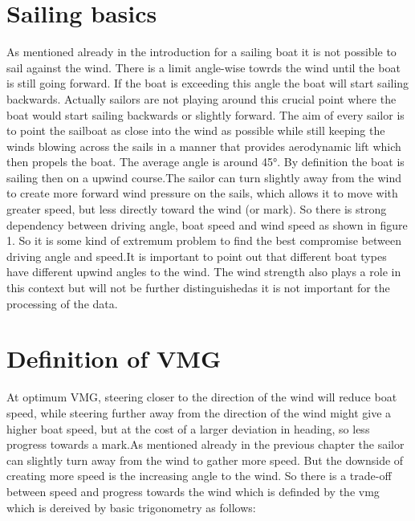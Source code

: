 \chapter{Sailing basics}
As mentioned already in the introduction for a sailing boat it is not possible to sail against the wind. There is a limit angle-wise towrds the wind until the boat is still going forward. If the boat is exceeding this angle the boat will start sailing backwards. Actually sailors are not playing around this crucial point where the boat would start sailing backwards or slightly forward. The aim of every sailor is to point the sailboat as close into the wind as possible while still keeping the winds blowing across the sails in a manner that provides aerodynamic lift which then propels the boat. The average angle is around 45°. By definition the boat is sailing then on a upwind course.The sailor can turn slightly away from the wind to create more forward wind pressure on the sails, which allows it to move with greater speed, but less directly toward the wind (or mark). So there is strong dependency between driving angle, boat speed and wind speed as 
shown in figure 1. So it is some kind of extremum problem to find the best compromise between driving angle and speed.It is important to point out that different boat types have different upwind angles to the wind. The wind strength also plays a role in this context but will not be further distinguishedas it is not important for the processing of the data. 


\chapter{Definition of VMG}
At optimum VMG, steering closer to the direction of the wind will reduce boat speed, while steering further away from the direction of the wind might give a higher boat speed, but at the cost of a larger deviation in heading, so less progress towards a mark.As mentioned already in the previous chapter the sailor can slightly turn away from the wind to gather more speed. But the downside of creating more speed is the increasing angle to the wind. So there is a trade-off between speed and progress towards the wind which is definded by the vmg which is dereived by basic trigonometry as follows:

